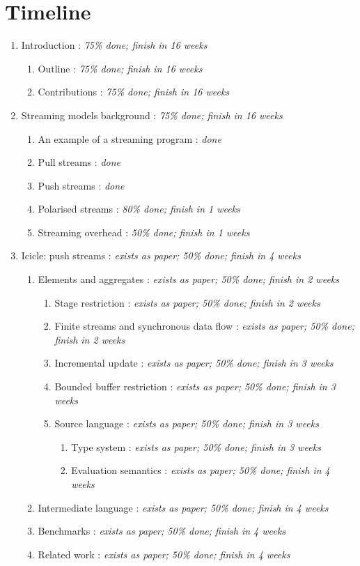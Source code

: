 
\section*{Timeline}

\newcommand\when[2] {: \emph{#1\% done; finish in #2 weeks}}
\newcommand\done {: \emph{done}}
\newcommand\ugh {\when{75}{16}}
\newcommand\uns[1] {\when{0}{#1}}
\newcommand\pap[2] {\when{exists as paper; #1}{#2}}


\begin{enumerate}
\item Introduction \ugh
  \begin{enumerate}
  \item Outline \ugh
  \item Contributions \ugh
  \end{enumerate}

\item Streaming models background \ugh
  \begin{enumerate}
  \item An example of a streaming program \done
  \item Pull streams \done
  \item Push streams \done
  \item Polarised streams \when{80}{1}
  \item Streaming overhead \when{50}{1}
  \end{enumerate}

\item Icicle: push streams \pap{50}{4}
  \begin{enumerate}
  \item Elements and aggregates \pap{50}{2}
    \begin{enumerate}
    \item Stage restriction \pap{50}{2}
    \item Finite streams and synchronous data flow \pap{50}{2}
    \item Incremental update \pap{50}{3}
    \item Bounded buffer restriction \pap{50}{3}
    \item Source language \pap{50}{3}
      \begin{enumerate}
      \item Type system \pap{50}{3}
      \item Evaluation semantics \pap{50}{4}
      \end{enumerate}
    \end{enumerate}
  \item Intermediate language \pap{50}{4}
  \item Benchmarks \pap{50}{4}
  \item Related work \pap{50}{4}
  \end{enumerate}


\end{enumerate}
